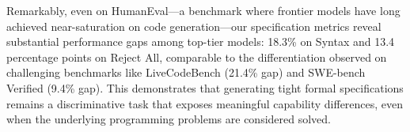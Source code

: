 Remarkably, even on HumanEval—a benchmark where frontier models have long achieved near-saturation on code generation—our specification metrics reveal substantial performance gaps among top-tier models: 18.3\% on Syntax and 13.4 percentage points on Reject All, comparable to the differentiation observed on challenging benchmarks like LiveCodeBench (21.4\% gap) and SWE-bench Verified (9.4\% gap). This demonstrates that generating tight formal specifications remains a discriminative task that exposes meaningful capability differences, even when the underlying programming problems are considered solved.

